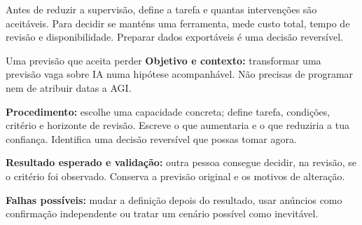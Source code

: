Antes de reduzir a supervisão, define a tarefa e quantas intervenções são aceitáveis. Para decidir se manténs uma ferramenta, mede custo total, tempo de revisão e disponibilidade. Preparar dados exportáveis é uma decisão reversível.

\begin{promptlabbox}{Uma previsão que aceita perder}
\textbf{Objetivo e contexto:} transformar uma previsão vaga sobre IA numa hipótese acompanhável. Não precisas de programar nem de atribuir datas a AGI.

\textbf{Procedimento:} escolhe uma capacidade concreta; define tarefa, condições, critério e horizonte de revisão. Escreve o que aumentaria e o que reduziria a tua confiança. Identifica uma decisão reversível que possas tomar agora.

\textbf{Resultado esperado e validação:} outra pessoa consegue decidir, na revisão, se o critério foi observado. Conserva a previsão original e os motivos de alteração.

\textbf{Falhas possíveis:} mudar a definição depois do resultado, usar anúncios como confirmação independente ou tratar um cenário possível como inevitável.
\end{promptlabbox}

